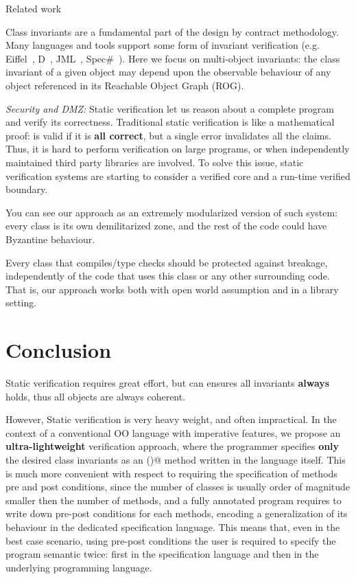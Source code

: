 Related work

Class invariants are a fundamental part of the design by contract methodology. 
Many languages and tools support some form of invariant verification (e.g. Eiffel~\cite{Meyer:1992:EL:129093}, D~\cite{Alexandrescu:2010:DPL:1875434}, JML~\cite{Burdy2005}, Spec\#~\cite{Barnett:2004:SPS:2131546.2131549}).
Here we focus on multi-object invariants: the class invariant of a given object may depend upon the observable behaviour of any object referenced in its Reachable Object Graph (ROG).

\noindent\textit{Security and DMZ:}
Static verification let us reason about a complete program
and verify its correctness.
Traditional static verification is like a mathematical proof: is valid if it is \textbf{all correct},
but a single error invalidates all the claims.
Thus, it is hard to perform verification on large programs, or when independently maintained third party libraries
are involved.
To solve this issue, static verification systems are starting to consider a verified core
and a run-time verified boundary.

You can see our approach as an extremely modularized version of such system:
every class is its own demilitarized zone, and the rest of the code 
could have Byzantine behaviour.

Every class that compiles/type checks should be protected against breakage,
 independently of the code that uses this class or any other surrounding code.
 That is, our approach works both with open world assumption and in a library setting.


\saveSpace
\section{Conclusion}
\label{s:conclusion}
\saveSpace

Static verification requires great effort, but can ensures all invariants \textbf{always} holds, thus all objects are always coherent.

However, Static verification is very heavy weight, and often impractical.
In the context of a conventional OO language with imperative features,
we propose an \textbf{ultra-lightweight} verification approach,
where the programmer specifies \textbf{only} the desired class invariants as an 
\Q@invariant()@ method written in the language itself.
This is much more convenient with respect to requiring the specification of methods pre and post conditions,
since the number of classes is usually order of magnitude smaller then the number of methods,
and a fully annotated program requires to write down 
pre-post conditions for each methods, encoding a generalization of its behaviour
in the dedicated specification language.
This means that, even in the best case scenario, 
using pre-post conditions
the user is required to specify the program semantic twice:
first in the specification language and then in the underlying programming language.


